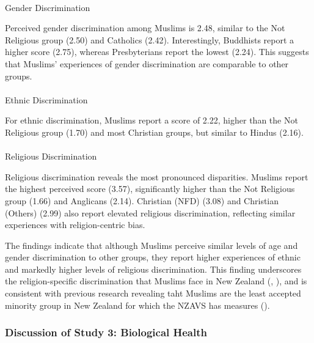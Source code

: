 \documentclass[
  single column]{article}
\makeatletter
\let\oldparagraph\paragraph
\renewcommand{\paragraph}{
    \@ifstar
      \xxxParagraphStar
      \xxxParagraphNoStar
  }
\newcommand{\xxxParagraphStar}[1]{\oldparagraph*{#1}\mbox{}}
\newcommand{\xxxParagraphNoStar}[1]{\oldparagraph{#1}\mbox{}}
\makeatother
\begin{document}
\paragraph{Gender Discrimination}\label{gender-discrimination}

Perceived gender discrimination among Muslims is 2.48, similar to the
Not Religious group (2.50) and Catholics (2.42). Interestingly,
Buddhists report a higher score (2.75), whereas Presbyterians report the
lowest (2.24). This suggests that Muslims' experiences of gender
discrimination are comparable to other groups.

\paragraph{Ethnic Discrimination}\label{ethnic-discrimination}

For ethnic discrimination, Muslims report a score of 2.22, higher than
the Not Religious group (1.70) and most Christian groups, but similar to
Hindus (2.16).

\paragraph{Religious Discrimination}\label{religious-discrimination}

Religious discrimination reveals the most pronounced disparities.
Muslims report the highest perceived score (3.57), significantly higher
than the Not Religious group (1.66) and Anglicans (2.14). Christian
(NFD) (3.08) and Christian (Others) (2.99) also report elevated
religious discrimination, reflecting similar experiences with
religion-centric bias.

The findings indicate that although Muslims perceive similar levels of
age and gender discrimination to other groups, they report higher
experiences of ethnic and markedly higher levels of religious
discrimination. This finding underscores the religion-specific
discrimination that Muslims face in New Zealand
(,
), and is consistent with previous
research revealing taht Muslims are the least accepted minority group in
New Zealand for which the NZAVS has measures
().

\subsubsection{Discussion of Study 3: Biological
Health}\label{discussion-of-study-3-biological-health}
\end{document}

